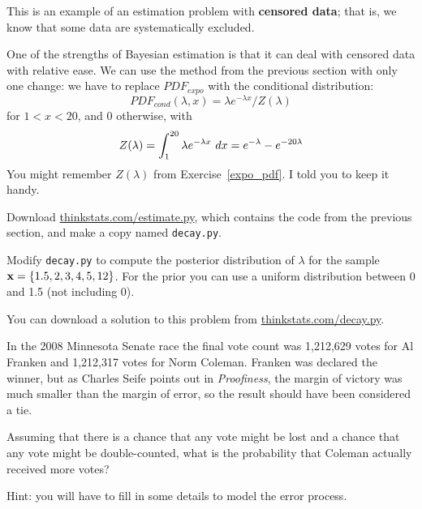 \documentclass[12pt]{book}
\begin{document}
This is an example of an estimation problem with {\bf censored data};
that is, we know that some data are systematically excluded.

One of the strengths of Bayesian estimation is that it can deal with
censored data with relative ease.  We can use the method from the
previous section with only one change: we have to replace
$PDF_{expo}$ with the conditional distribution:
%
\[ PDF_{cond}(\lambda, x) = \lambda e^{-\lambda x} / Z(\lambda)  \]
%
for $1 < x < 20$, and 0 otherwise, with
%
\[ Z(\lambda) = \int_1^{20} \lambda e^{-\lambda x} ~ dx = 
e^{-\lambda} - e^{-20 \lambda}  \]
%
You might remember $Z(\lambda)$ from Exercise~\ref{expo_pdf}.  I told
you to keep it handy.

\begin{exercise}
Download \url{thinkstats.com/estimate.py}, which contains the code
from the previous section, and make a copy named {\tt decay.py}.


Modify {\tt decay.py} to compute the posterior distribution of
$\lambda$ for the sample $\mathbf{x} = \{ 1.5, 2, 3, 4, 5, 12 \}$.  For
the prior you can use a uniform distribution between 0
and 1.5 (not including 0).


You can download a solution to this problem from
\url{thinkstats.com/decay.py}.


\end{exercise}


\begin{exercise}
In the 2008 Minnesota Senate race the final vote count was 1,212,629
votes for Al Franken and 1,212,317 votes for Norm Coleman.  Franken
was declared the winner, but as Charles Seife points out in {\it
  Proofiness}, the margin of victory was much smaller than the margin
of error, so the result should have been considered a tie.



Assuming that there is a chance that any vote might be lost and a chance
that any vote might be double-counted, what is the probability that
Coleman actually received more votes?

Hint: you will have to fill in some details to model the error process.

\end{exercise}
\end{document}
